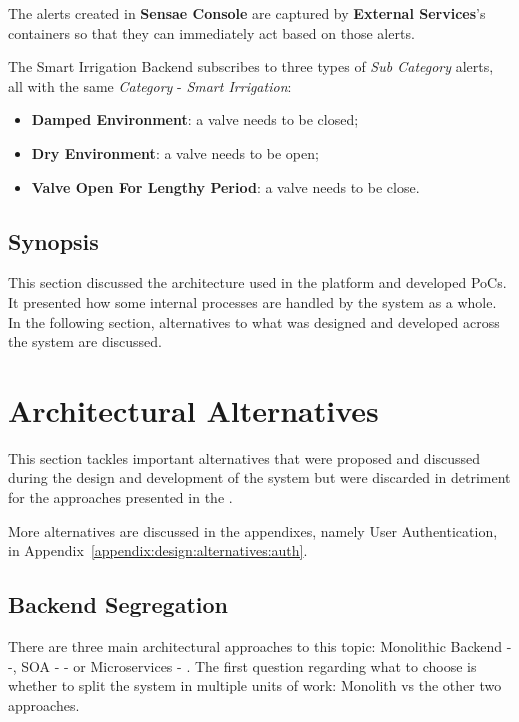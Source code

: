 The alerts created in \textbf{Sensae Console} are captured by \textbf{External Services}'s containers so that they can immediately act based on those alerts.

The Smart Irrigation Backend subscribes to three types of \textit{Sub Category} alerts, all with the same \textit{Category} - \textit{Smart Irrigation}:

\begin{itemize}
   \item \textbf{Damped Environment}: a valve needs to be closed;
   \item \textbf{Dry Environment}: a valve needs to be open;
   \item \textbf{Valve Open For Lengthy Period}: a valve needs to be close.
\end{itemize}

\subsection{Synopsis}
\label{subsubsec:design:architecture:synopsis}

This section discussed the architecture used in the platform and developed \gls{PoC}s. It presented how some internal processes are handled by the system as a whole.
In the following section, alternatives to what was designed and developed across the system are discussed.

\section{Architectural Alternatives}
\label{sec:design:alternatives}

This section tackles important alternatives that were proposed and discussed during the design and development of the system but were discarded in detriment for the approaches presented in the .

More alternatives are discussed in the appendixes, namely User Authentication, in Appendix~\ref{appendix:design:alternatives:auth}.

\subsection{Backend Segregation}
\label{subsec:design:alternatives:backend}

There are three main architectural approaches to this topic: Monolithic Backend - \cite{micromono} -, \gls{SOA} - \cite{ibmsoa} - or Microservices - \cite{martinmicro}. The first question regarding what to choose is whether to split the system in multiple units of work: Monolith vs the other two approaches.

